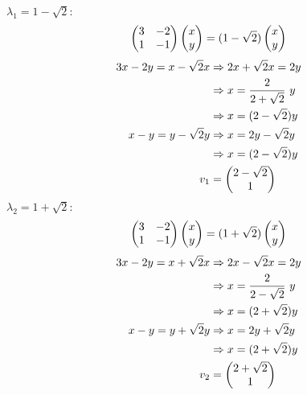 \documentclass[12pt]{amsart}
\begin{document}
\begin{enumerate}
\begin{enumerate}
			$\lambda_1=1-\sqrt{2}:$
			\begin{align}
				\begin{pmatrix}
					3 &-2\\
					1 &-1
				\end{pmatrix}
				\begin{pmatrix}
					x \\
					y
				\end{pmatrix}=(1-\sqrt{2})
				\begin{pmatrix}
					x \\
					y
				\end{pmatrix} \notag
				\end{align}
			\begin{align}
				3x-2y=x-\sqrt{2}x &\Rightarrow 2x+\sqrt{2}x=2y \notag \\
				&\Rightarrow x=\frac{2}{2+\sqrt{2}} \text{ }y \notag \\
				&\Rightarrow x=(2-\sqrt{2})y \notag \\
				x-y=y-\sqrt{2}y &\Rightarrow x=2y-\sqrt{2}y \notag \\
				&\Rightarrow x=(2-\sqrt{2})y \notag \\
				v_1&= 
					\begin{pmatrix}
						2-\sqrt{2} \\
						1 
					\end{pmatrix} \notag		
				\end{align} 
			$\lambda_2=1+\sqrt{2}:$
			\begin{align}
				\begin{pmatrix}
					3 &-2 \\
					1 &-1
				\end{pmatrix}
				\begin{pmatrix}
					x \\
					y
				\end{pmatrix}=(1+\sqrt{2})
				\begin{pmatrix}
					x \\
					y
				\end{pmatrix} \notag
				\end{align}
			\begin{align}
				3x-2y=x+\sqrt{2}x &\Rightarrow 2x-\sqrt{2}x=2y \notag \\
				&\Rightarrow x=\frac{2}{2-\sqrt{2}} \text{ }y \notag \\
				&\Rightarrow x=(2+\sqrt{2})y \notag \\
				x-y=y+\sqrt{2}y &\Rightarrow x=2y+\sqrt{2}y \notag \\
				&\Rightarrow x=(2+\sqrt{2})y \notag \\
				v_2&= 
					\begin{pmatrix}
						2+\sqrt{2} \\
						1
					\end{pmatrix} \notag	
			\end{align} \\
			

\end{enumerate}
\end{enumerate}
\end{document}
